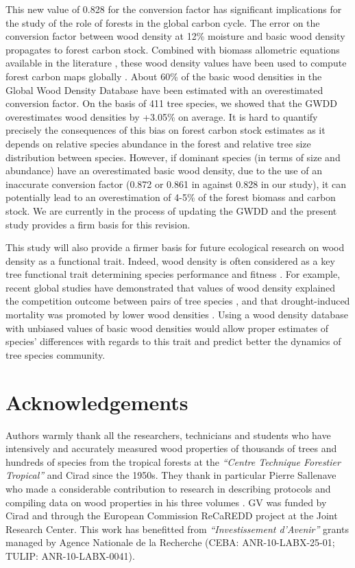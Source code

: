 \documentclass[a4paper, 12pt, leqno, dvipsnames]{article}\usepackage[]{graphicx}\usepackage[]{color}
\begin{document}
This new value of 0.828 for the conversion factor has significant implications for the study of the role of forests in the global carbon cycle. The error on the conversion factor between wood density at 12\% moisture and basic wood density propagates to forest carbon stock. Combined with biomass allometric equations available in the literature \citep{Chave2005, Chave2014, Vieilledent2012}, these wood density values have been used to compute forest carbon maps globally \citep{Saatchi2011, Baccini2012, Avitabile2016, Baccini2017}. About 60\% of the basic wood densities in the Global Wood Density Database have been estimated with an overestimated conversion factor. On the basis of 411 tree species, we showed that the GWDD overestimates wood densities by +3.05\% on average. It is hard to quantify precisely the consequences of this bias on forest carbon stock estimates as it depends on relative species abundance in the forest and relative tree size distribution between species. However, if dominant species (in terms of size and abundance) have an overestimated basic wood density, due to the use of an inaccurate conversion factor (0.872 or 0.861 in \citet{Chave2006, Chave2009} against 0.828 in our study), it can potentially lead to an overestimation of 4-5\% of the forest biomass and carbon stock. We are currently in the process of updating the GWDD and the present study provides a firm basis for this revision.

This study will also provide a firmer basis for future ecological research on wood density as a functional trait. Indeed, wood density is often considered as a key tree functional trait determining species performance and fitness \citep{Chave2009, Baraloto2010, Kunstler2016, Diaz2016, Greenwood2017}. For example, recent global studies have demonstrated that values of wood density explained the competition outcome between pairs of tree species \citep{Kunstler2016}, and that drought-induced mortality was promoted by lower wood densities \citep{Greenwood2017}. Using a wood density database with unbiased values of basic wood densities would allow proper estimates of species' differences with regards to this trait and predict better the dynamics of tree species community.

\newpage

\section{Acknowledgements}

Authors warmly thank all the researchers, technicians and students who have intensively and accurately measured wood properties of thousands of trees and hundreds of species from the tropical forests at the \emph{``Centre Technique Forestier Tropical''} and Cirad since the 1950s. They thank in particular Pierre Sallenave who made a considerable contribution to research in describing protocols and compiling data on wood properties in his three volumes \citep{Sallenave1955, Sallenave1964, Sallenave1971}. GV was funded by Cirad and through the European Commission ReCaREDD project at the Joint Research Center. This work has benefitted from \emph{``Investissement d'Avenir''} grants managed by Agence Nationale de la Recherche (CEBA: ANR-10-LABX-25-01; TULIP: ANR-10-LABX-0041).
\end{document}
